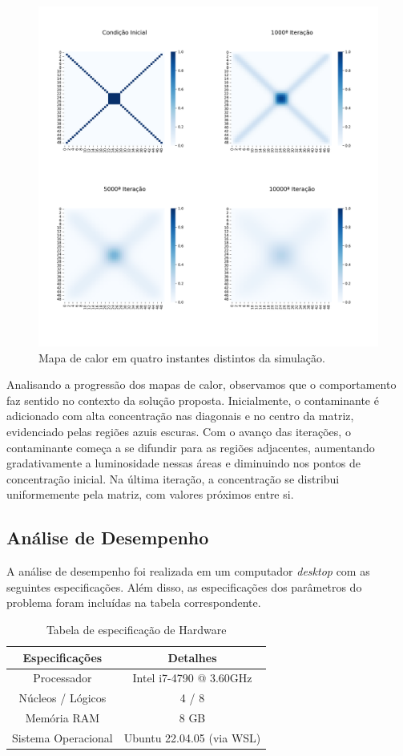 \documentclass[12pt]{article}
\begin{document}
\begin{figure}[ht]
\centering
\includegraphics[width=.7\textwidth]{figs/heatmap.png}
\caption{Mapa de calor em quatro instantes distintos da simulação.}
\label{fig:heatmap}
\end{figure}

Analisando a progressão dos mapas de calor, observamos que o comportamento faz sentido no contexto da solução proposta. Inicialmente, o contaminante é adicionado com alta concentração nas diagonais e no centro da matriz, evidenciado pelas regiões azuis escuras. Com o avanço das iterações, o contaminante começa a se difundir para as regiões adjacentes, aumentando gradativamente a luminosidade nessas áreas e diminuindo nos pontos de concentração inicial. Na última iteração, a concentração se distribui uniformemente pela matriz, com valores próximos entre si.

\subsection{Análise de Desempenho}

A análise de desempenho foi realizada em um computador \textit{desktop} com as seguintes especificações. Além disso, as especificações dos parâmetros do problema foram incluídas na tabela correspondente.

\begin{table}[ht]
\centering
\caption{Tabela de especificação de Hardware}
\vspace{0.3cm}
\begin{tabular}{||c c||} 
 \hline
Especificações & Detalhes \\ [0.5ex] 
 \hline\hline
 Processador & Intel i7-4790 @ 3.60GHz \\ 
 \hline
 Núcleos / Lógicos & 4 / 8  \\
 \hline
 Memória RAM & 8 GB  \\
 \hline
 Sistema Operacional & Ubuntu 22.04.05 (via WSL)   \\ 
 \hline
\end{tabular}
\end{table}
\end{document}
